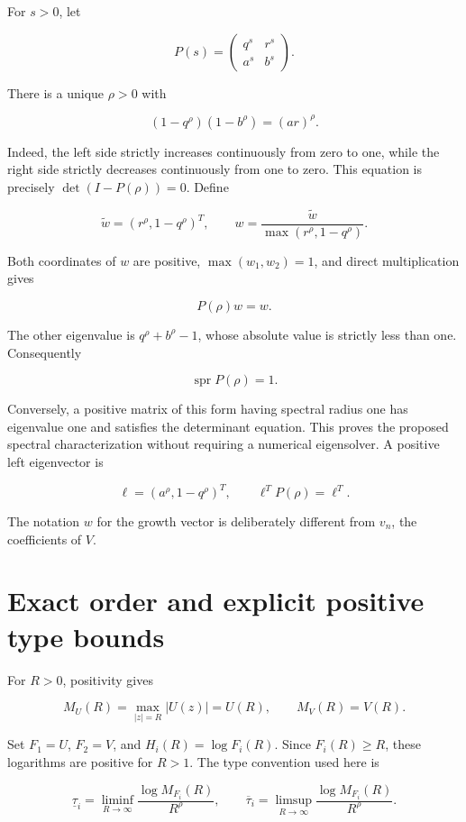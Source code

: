 For \(s>0\), let

\[
P(s)=\begin{pmatrix}q^s&r^s\\a^s&b^s\end{pmatrix}.
\]

There is a unique \(\rho>0\) with

\[
\boxed{(1-q^\rho)(1-b^\rho)=(ar)^\rho.}
\]

Indeed, the left side strictly increases continuously from zero to one,
while the right side strictly decreases continuously from one to zero.
This equation is precisely \(\det(I-P(\rho))=0\). Define

\[
\widetilde w=(r^\rho,1-q^\rho)^T,
\qquad
w=\frac{\widetilde w}{\max(r^\rho,1-q^\rho)}.
\]

Both coordinates of \(w\) are positive, \(\max(w_1,w_2)=1\), and direct
multiplication gives

\[
P(\rho)w=w.
\]

The other eigenvalue is \(q^\rho+b^\rho-1\), whose absolute value is
strictly less than one. Consequently

\[
\boxed{\operatorname{spr}P(\rho)=1.}
\]

Conversely, a positive matrix of this form having spectral radius one
has eigenvalue one and satisfies the determinant equation. This proves
the proposed spectral characterization without requiring a numerical
eigensolver. A positive left eigenvector is

\[
\ell=(a^\rho,1-q^\rho)^T,\qquad \ell^TP(\rho)=\ell^T.
\]

The notation \(w\) for the growth vector is deliberately different from
\(v_n\), the coefficients of \(V\).

\hypertarget{v11-coupled_growth_full-exact-order-and-explicit-positive-type-bounds}{%
\section{Exact order and explicit positive type
bounds}\label{v11-coupled_growth_full-exact-order-and-explicit-positive-type-bounds}}

For \(R>0\), positivity gives

\[
M_U(R)=\max_{|z|=R}|U(z)|=U(R),\qquad
M_V(R)=V(R).
\]

Set \(F_1=U\), \(F_2=V\), and \(H_i(R)=\log F_i(R)\). Since
\(F_i(R)\ge R\), these logarithms are positive for \(R>1\). The type
convention used here is

\[
\underline\tau_i=\liminf_{R\to\infty}\frac{\log M_{F_i}(R)}{R^\rho},
\qquad
\overline\tau_i=\limsup_{R\to\infty}\frac{\log M_{F_i}(R)}{R^\rho}.
\]

